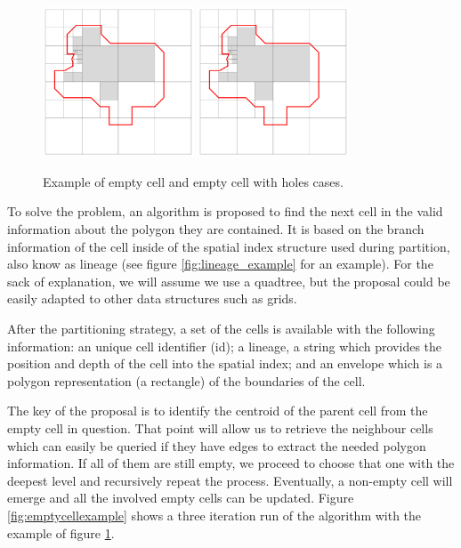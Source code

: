 \begin{figure}[!ht]
    \centering
    \includegraphics[page=1, width=0.4\textwidth]{figures/cellinpolygon/emptycells.pdf}
    \includegraphics[page=2, width=0.4\textwidth]{figures/cellinpolygon/emptycells.pdf}
    \caption{Example of empty cell and empty cell with holes cases.}\label{fig:emptycells}
\end{figure}

To solve the problem, an algorithm is proposed to find the next cell in the valid information about the polygon they are contained.  It is based on the branch information of the cell inside of the spatial index structure used during partition, also know as lineage (see figure \ref{fig:lineage_example} for an example).  For the sack of explanation, we will assume we use a quadtree, but the proposal could be easily adapted to other data structures such as grids.

After the partitioning strategy, a set of the cells is available with the following information: an unique cell identifier (id); a lineage, a string which provides the position and depth of the cell into the spatial index; and an envelope which is a polygon representation (a rectangle) of the boundaries of the cell.

The key of the proposal is to identify the centroid of the parent cell from the empty cell in question.  That point will allow us to retrieve the neighbour cells which can easily be queried if they have edges to extract the needed polygon information.  If all of them are still empty, we proceed to choose that one with the deepest level and recursively repeat the process.  Eventually, a non-empty cell will emerge and all the involved empty cells can be updated.  Figure \ref{fig:emptycellexample} shows a three iteration run of the algorithm with the example of figure \ref{fig:emptycells}.

